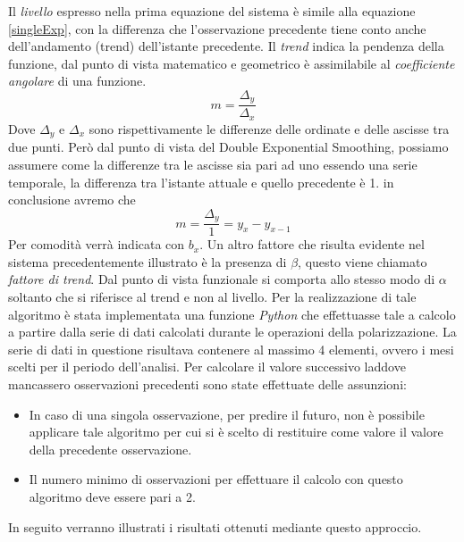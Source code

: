 Il \textit{livello} espresso nella prima equazione del sistema è simile alla equazione \ref{singleExp}, con la differenza che l'osservazione precedente tiene conto anche dell'andamento (trend) dell'istante precedente.
Il \textit{trend} indica la pendenza della funzione, dal punto di vista matematico e geometrico è assimilabile al \textit{coefficiente angolare} di una funzione.
\begin{equation}
m=\dfrac{\Delta_{y}}{\Delta_{x}}
\end{equation}
Dove $\Delta_{y}$ e $\Delta_{x}$ sono rispettivamente le differenze delle ordinate e delle ascisse tra due punti. Però dal punto di vista del Double Exponential Smoothing, possiamo assumere come la differenze tra le ascisse sia pari ad uno essendo una serie temporale, la differenza tra l'istante attuale e quello precedente è 1. in conclusione avremo che 
\begin{equation}
m=\dfrac{\Delta_{y}}{1}= y_{x}-y_{x-1}
\end{equation}
Per comodità verrà indicata con  $b_{x}$.
Un altro fattore che risulta evidente nel sistema precedentemente illustrato è la presenza di $\beta$, questo viene chiamato \textit{fattore di trend}. Dal punto di vista funzionale si comporta allo stesso modo di $\alpha$ soltanto che si riferisce al trend e non al livello.
Per la realizzazione di tale algoritmo è stata implementata una funzione \textit{Python} che effettuasse tale a calcolo a partire dalla serie di dati calcolati durante le operazioni della polarizzazione.
La serie di dati in questione risultava contenere al massimo 4 elementi, ovvero i mesi scelti per il periodo dell'analisi. Per calcolare il valore successivo laddove mancassero osservazioni precedenti sono state effettuate delle assunzioni:
\begin{itemize}
\item In caso di una singola osservazione, per predire il futuro, non è possibile applicare tale algoritmo per cui si è scelto di restituire come valore il valore della precedente  osservazione.
\item Il numero minimo di osservazioni per effettuare il calcolo con questo algoritmo deve essere pari a 2.
\end{itemize}
In seguito verranno illustrati i risultati ottenuti mediante questo approccio.
